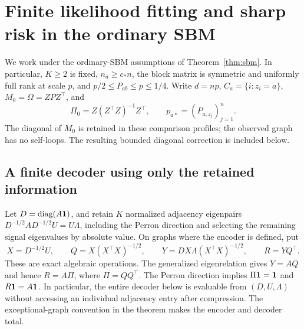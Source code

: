 \section{Finite likelihood fitting and sharp risk in the ordinary SBM}
\label{sec:sbm-proof}
\label{sbm:section}

We work under the ordinary-SBM assumptions of Theorem~\ref{thm:sbm}.
In particular, $K\ge2$ is fixed, $n_a\ge c_*n$, the block matrix is
symmetric and uniformly full rank at scale $p$, and
$p/2\le P_{ab}\le p\le1/4$. Write $d=np$, $C_a=\{i:z_i=a\}$,
$M_0=\Omega=ZPZ^\top$, and
\[
 \Pi_0=Z(Z^\top Z)^{-1}Z^\top,
 \qquad p_{a*}=(P_{a,z_j})_{j=1}^n.
\]
The diagonal of $M_0$ is retained in these comparison profiles;
the observed graph has no self-loops. The resulting bounded diagonal
correction is included below.

\subsection{A finite decoder using only the retained information}
\label{sbm:algorithm}

Let $D=\operatorname{diag}(A\mathbf 1)$, and retain $K$ normalized adjacency eigenpairs
$D^{-1/2}AD^{-1/2}U=U\Lambda$, including the Perron direction and
selecting the remaining signal eigenvalues by absolute value. On graphs
where the encoder is defined, put
\[
 X=D^{-1/2}U,\qquad
 Q=X(X^\top X)^{-1/2},\qquad
 Y=DX\Lambda(X^\top X)^{-1/2},\qquad
 R=YQ^\top.
\]
These are exact algebraic operations. The generalized eigenrelation gives
$Y=AQ$ and hence $R=A\Pi$, where $\Pi=QQ^\top$. The Perron direction
implies $\Pi\mathbf 1=\mathbf 1$ and $R\mathbf 1=A\mathbf 1$. In particular, the entire
decoder below is evaluable from $(D,U,\Lambda)$ without accessing an
individual adjacency entry after compression. The exceptional-graph
convention in the theorem makes the encoder and decoder total.

